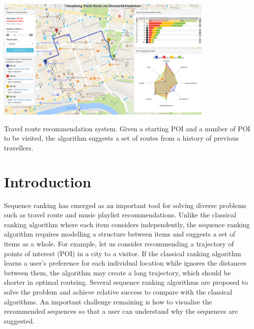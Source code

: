 \documentclass[sigconf]{acmart}
\begin{document}


 \begin{teaserfigure}
 \centering
   \includegraphics[width=0.8\textwidth]{figure/sample_map.png}
   \caption{Travel route recommendation system. Given a starting POI and a number of POI to be visited, the algorithm suggests a set of routes from a history of previous travellers.}
   \label{fig:overview}
 \end{teaserfigure}

\maketitle


\section{Introduction}
Sequence ranking has emerged as an important tool for solving diverse problems such as travel route and music playlist recommendations. Unlike the classical ranking algorithm where each item considers independently, the sequence ranking algorithm requires modelling a structure between items and suggests a set of items as a whole. For example, let us consider recommending a trajectory of points of interest (POI) in a city to a visitor. If the classical ranking algorithm learns a user's preference for each individual location while ignores the distances between them, the algorithm may create a long trajectory, which should be shorter in optimal routeing. Several sequence ranking algorithms are proposed to solve the problem and achieve relative success to compare with the classical algorithms. An important challenge remaining is how to visualise the recommended sequences so that a user can understand why the sequences are suggested.
\end{document}
